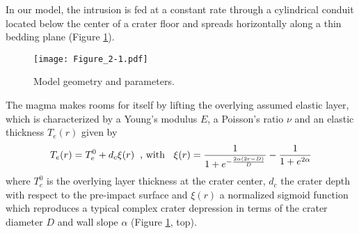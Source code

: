 In  our model,  the intrusion  is  fed at  a constant  rate through  a
cylindrical conduit  located below  the center of  a crater  floor and
spreads   horizontally   along   a    thin   bedding   plane   (Figure
\ref{Figure2-1}).
\begin{figure}[h!]
  \graphicspath{ {/Users/thorey/Documents/These/Projet/FFC/Gravi_GRAIL/Article/Papier/SOUMISSION_2_EPSL/} }
  \begin{center}
    \texttt{[image: Figure\_2-1.pdf]}
    \caption{Model geometry and parameters.}
    \label{Figure2-1}
  \end{center}
\end{figure}
The  magma makes  rooms for  itself by  lifting the  overlying assumed
elastic  layer, which  is characterized  by a  Young's modulus  $E$, a
Poisson's ratio $\nu$ and an elastic thickness $T_e(r)$ given by
\begin{equation}
  T_e(r)=T_e^0+d_c\xi(r)\hspace{.2cm}\text{, with }\hspace{.2cm} \xi(r)=\frac{1}{1+e^{-\frac{2\alpha(2r-D)}{D}}}-\frac{1}{1+e^{2\alpha}}\label{topo}\\
\end{equation}
where $T_e^0$ is  the overlying layer thickness at  the crater center,
$d_c$  the crater  depth with  respect to  the pre-impact  surface and
$\xi(r)$  a normalized  sigmoid  function which  reproduces a  typical
complex crater depression in terms of the crater diameter $D$ and wall
slope $\alpha$ (Figure \ref{Figure2-1}, top).

